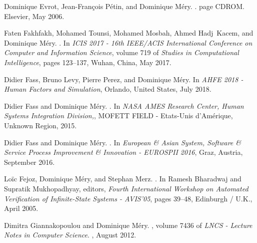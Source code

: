 \documentclass[ 12pt]{article}
\begin{document}
\begin{thebibliography}{100}
Dominique Evrot, Jean-Fran{\c c}ois P{\'e}tin, and Dominique M{\'e}ry.
.
\newblock page CDROM. {Elsevier}, May 2006.

Faten Fakhfakh, Mohamed Tounsi, Mohamed Mosbah, Ahmed Hadj~Kacem, and Dominique
  M{\'e}ry.
.
\newblock In {\em {ICIS 2017 - 16th IEEE/ACIS International Conference on
  Computer and Information Science}}, volume 719 of {\em Studies in
  Computational Intelligence}, pages 123--137, Wuhan, China, May 2017.

Didier Fass, Bruno Levy, Pierre Perez, and Dominique M{\'e}ry.
\newblock In {\em {AHFE 2018 - Human Factors and Simulation}}, Orlando, United
  States, July 2018.

Didier Fass and Dominique M{\'e}ry.
.
\newblock In {\em {NASA AMES Research Center, Human Systems Integration
  Division,}}, MOFETT FIELD - Etats-Unis d'Am{\'e}rique, Unknown Region, 2015.

Didier Fass and Dominique M{\'e}ry.
.
\newblock In {\em {European \& Asian System, Software \& Service Process
  Improvement \& Innovation - EUROSPII 2016}}, Graz, Austria, September 2016.

Lo{\"i}c Fejoz, Dominique M{\'e}ry, and Stephan Merz.
.
\newblock In Ramesh Bharadwaj and Supratik Mukhopadhyay, editors, {\em {Fourth
  International Workshop on Automated Verification of Infinite-State Systems -
  AVIS'05}}, pages 39--48, Edinburgh / U.K., April 2005.

Dimitra Giannakopoulou and Dominique M{\'e}ry.
, volume 7436 of {\em LNCS - Lecture
  Notes in Computer Science}.
, August 2012.


\end{thebibliography}
\end{document}
